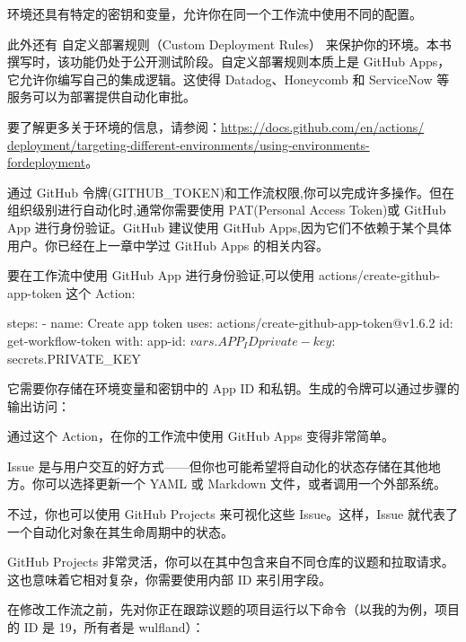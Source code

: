 环境还具有特定的密钥和变量，允许你在同一个工作流中使用不同的配置。

此外还有 自定义部署规则（Custom Deployment Rules） 来保护你的环境。本书撰写时，该功能仍处于公开测试阶段。自定义部署规则本质上是 GitHub Apps，它允许你编写自己的集成逻辑。这使得 Datadog、Honeycomb 和 ServiceNow 等服务可以为部署提供自动化审批。

要了解更多关于环境的信息，请参阅：\url{https://docs.github.com/en/actions/ deployment/targeting-different-environments/using-environments-fordeployment}。


通过 GitHub 令牌(GITHUB\_TOKEN)和工作流权限,你可以完成许多操作。但在组织级别进行自动化时,通常你需要使用 PAT(Personal Access Token)或 GitHub App 进行身份验证。GitHub 建议使用 GitHub Apps,因为它们不依赖于某个具体用户。你已经在上一章中学过 GitHub Apps 的相关内容。

要在工作流中使用 GitHub App 进行身份验证,可以使用 actions/create-github-app-token 这个 Action:

\begin{shell}
steps:
  - name: Create app token
    uses: actions/create-github-app-token@v1.6.2
    id: get-workflow-token
    with:
      app-id: ${{ vars.APP_ID }}
      private-key: ${{ secrets.PRIVATE_KEY }}
\end{shell}

它需要你存储在环境变量和密钥中的 App ID 和私钥。生成的令牌可以通过步骤的输出访问：


通过这个 Action，在你的工作流中使用 GitHub Apps 变得非常简单。


Issue 是与用户交互的好方式——但你也可能希望将自动化的状态存储在其他地方。你可以选择更新一个 YAML 或 Markdown 文件，或者调用一个外部系统。

不过，你也可以使用 GitHub Projects 来可视化这些 Issue。这样，Issue 就代表了一个自动化对象在其生命周期中的状态。

GitHub Projects 非常灵活，你可以在其中包含来自不同仓库的议题和拉取请求。这也意味着它相对复杂，你需要使用内部 ID 来引用字段。

在修改工作流之前，先对你正在跟踪议题的项目运行以下命令（以我的为例，项目的 ID 是 19，所有者是 wulfland）：

